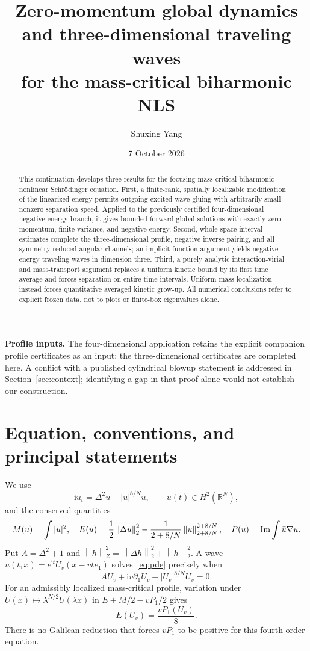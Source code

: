 \documentclass[11pt,a4paper]{article}
\title{Zero-momentum global dynamics and three-dimensional traveling waves\\for the mass-critical biharmonic NLS}
\author{Shuxing Yang}
\date{7 October 2026}
\theoremstyle{remark}\newtheorem{remark}[theorem]{Remark}
\newcommand{\R}{\mathbb R}\newcommand{\C}{\mathbb C}
\newcommand{\ii}{\mathrm i}\newcommand{\dd}{\,\mathrm d}
\newcommand{\norm}[1]{\left\|#1\right\|}
\begin{document}
\maketitle
\begin{abstract}
This continuation develops three results for the focusing mass-critical biharmonic nonlinear Schr\"odinger equation. First, a finite-rank, spatially localizable modification of the linearized energy permits outgoing excited-wave gluing with arbitrarily small nonzero separation speed. Applied to the previously certified four-dimensional negative-energy branch, it gives bounded forward-global solutions with exactly zero momentum, finite variance, and negative energy. Second, whole-space interval estimates complete the three-dimensional profile, negative inverse pairing, and all symmetry-reduced angular channels; an implicit-function argument yields negative-energy traveling waves in dimension three. Third, a purely analytic interaction-virial and mass-transport argument replaces a uniform kinetic bound by its first time average and forces separation on entire time intervals. Uniform mass localization instead forces quantitative averaged kinetic grow-up. All numerical conclusions refer to explicit frozen data, not to plots or finite-box eigenvalues alone.
\end{abstract}

\noindent\textbf{Profile inputs.} The four-dimensional application retains the explicit companion profile certificates as an input; the three-dimensional certificates are completed here.  A conflict with a published cylindrical blowup statement is addressed in Section~\ref{sec:context}; identifying a gap in that proof alone would not establish our construction.

\section{Equation, conventions, and principal statements}
We use
\begin{equation}\label{eq:pde}
 \ii u_t=\Delta^2u-|u|^{8/N}u,\qquad u(t)\in H^2(\R^N),
\end{equation}
and the conserved quantities
\[
 M(u)=\int|u|^2,\quad
 E(u)=\frac12\norm{\Delta u}_2^2-
 \frac1{2+8/N}\norm u_{2+8/N}^{2+8/N},\quad
 P(u)=\Ima\int\bar u\nabla u.
\]
Put $A=\Delta^2+1$ and $\norm h_Z^2=\norm{\Delta h}_2^2+\norm h_2^2$.
A wave $u(t,x)=e^{\ii t}U_v(x-vte_1)$ solves~\eqref{eq:pde} precisely when
\begin{equation}\label{eq:profile}
 A U_v+\ii v\partial_1U_v-|U_v|^{8/N}U_v=0.
\end{equation}
For an admissibly localized mass-critical profile, variation under
$U(x)\mapsto\lambda^{N/2}U(\lambda x)$ in
$E+M/2-vP_1/2$ gives
\begin{equation}\label{eq:pohozaev}
 E(U_v)=\frac{vP_1(U_v)}8.
\end{equation}
There is no Galilean reduction that forces $vP_1$ to be positive for this fourth-order equation.
\end{document}
